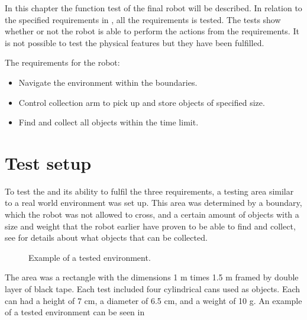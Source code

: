 In this chapter the function test of the final robot will be described. In relation to the specified requirements in , all the requirements is tested. The tests show whether or not the robot is able to perform the actions from the requirements. It is not possible to test the physical features but they have been fulfilled.

The requirements for the robot: 
\begin{itemize}
\item Navigate the environment within the boundaries.
\item Control collection arm to pick up and store objects of specified size.
\item Find and collect all objects within the time limit.
\end{itemize}


\section{Test setup}
To test the \projname{} and its ability to fulfil the three requirements, a testing area similar to a real world environment was set up. This area was determined by a boundary, which the robot was not allowed to cross, and a certain amount of objects with a size and weight that the robot earlier have proven to be able to find and collect, see  for details about what objects that can be collected.

\begin{figure}[H]
     \caption{\label{fig:test-setup} Example of a tested environment.}
\end{figure}

The area was a rectangle with the dimensions 1 m times 1.5 m framed by double layer of black tape. Each test included four cylindrical cans used as objects. Each can had a height of 7 cm, a diameter of 6.5 cm, and a weight of 10 g. An example of a tested environment can be seen in 

